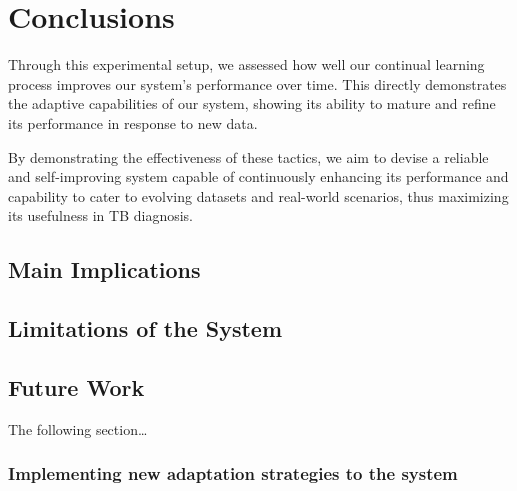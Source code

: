 \documentclass[../main.tex]{subfiles}
\begin{document}
\chapter{Conclusions} \label{chap:conclusions} 
    

    Through this experimental setup, we assessed how well our continual learning process improves our system's performance over time. This directly demonstrates the adaptive capabilities of our system, showing its ability to mature and refine its performance in response to new data.

     By demonstrating the effectiveness of these tactics, we aim to devise a reliable and self-improving system capable of continuously enhancing its performance and capability to cater to evolving datasets and real-world scenarios, thus maximizing its usefulness in TB diagnosis.
    
    


     

    \section{Main Implications} \label{conclusions:implications} 

    \section{Limitations of the System} \label{conclusions:limitations} 
    
    \section{Future Work} \label{conclusions:future_work} 

    The following section\dots

    \subsection{
        Implementing new adaptation strategies to the system 
    } \label{conclusions:future_work:adaptation_strategies}
\end{document}

